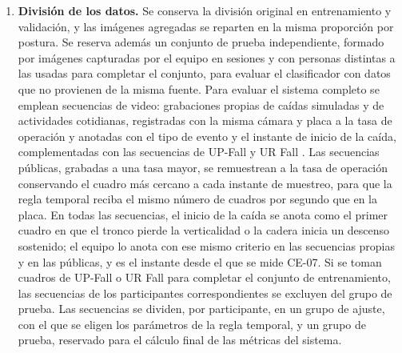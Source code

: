 \documentclass[12pt,a4paper,oneside]{book}
\theoremstyle{plain}
\theoremstyle{definition}
\theoremstyle{remark}
\begin{document}
\begin{enumerate}
  \item \textbf{División de los datos.} Se conserva la división original en entrenamiento y validación, y las imágenes agregadas se reparten en la misma proporción por postura. Se reserva además un conjunto de prueba independiente, formado por imágenes capturadas por el equipo en sesiones y con personas distintas a las usadas para completar el conjunto, para evaluar el clasificador con datos que no provienen de la misma fuente. Para evaluar el sistema completo se emplean secuencias de video: grabaciones propias de caídas simuladas y de actividades cotidianas, registradas con la misma cámara y placa a la tasa de operación y anotadas con el tipo de evento y el instante de inicio de la caída, complementadas con las secuencias de UP-Fall \parencite{martinez2019upfall} y UR Fall \parencite{kwolek2014human}. Las secuencias públicas, grabadas a una tasa mayor, se remuestrean a la tasa de operación conservando el cuadro más cercano a cada instante de muestreo, para que la regla temporal reciba el mismo número de cuadros por segundo que en la placa. En todas las secuencias, el inicio de la caída se anota como el primer cuadro en que el tronco pierde la verticalidad o la cadera inicia un descenso sostenido; el equipo lo anota con ese mismo criterio en las secuencias propias y en las públicas, y es el instante desde el que se mide CE-07. Si se toman cuadros de UP-Fall o UR Fall para completar el conjunto de entrenamiento, las secuencias de los participantes correspondientes se excluyen del grupo de prueba. Las secuencias se dividen, por participante, en un grupo de ajuste, con el que se eligen los parámetros de la regla temporal, y un grupo de prueba, reservado para el cálculo final de las métricas del sistema.
\end{enumerate}
\end{document}
